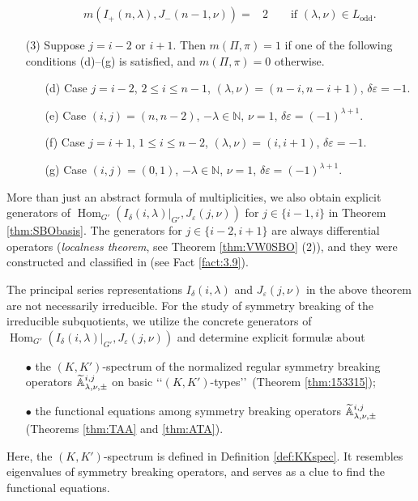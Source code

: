 \begin{theorem}
\begin{enumerate}
\begin{enumerate}
\begin{align*}
\\
m(I_+(n,\lambda), J_-(n-1,\nu))
=&
2
\qquad
\text{if }
(\lambda, \nu) \in L_{\operatorname{odd}}.   
\end{align*}
\end{enumerate}
\item[{\rm{(3)}}]
Suppose $j=i-2$ or $i+1$.  
Then $m(\Pi,\pi)=1$ 
 if one of the following conditions {\rm{(d)--(g)}}
 is satisfied, 
 and $m(\Pi,\pi)=0$ otherwise.  
\begin{enumerate}
\item[{\rm{(d)}}]
Case $j=i-2$, $2 \le i \le n-1$, $(\lambda, \nu)=(n-i,n-i+1)$, 
$\delta \varepsilon =-1$.  
\item[{\rm{(e)}}]
Case $(i,j)=(n,n-2)$, $-\lambda \in {\mathbb{N}}$, $\nu=1$, 
$\delta \varepsilon =(-1)^{\lambda+1}$.  
\item[{\rm{(f)}}]
Case $j=i+1$, $1 \le i \le n-2$, $(\lambda, \nu)=(i,i+1)$, 
$\delta \varepsilon =-1$.  
\item[{\rm{(g)}}]
Case $(i,j)=(0,1)$, $-\lambda \in {\mathbb{N}}$, $\nu=1$, 
$\delta \varepsilon =(-1)^{\lambda+1}$.  
\end{enumerate}
\end{enumerate}
\end{theorem}

\medskip
More than just an abstract formula of multiplicities, 
 we also obtain explicit generators
 of ${\operatorname{Hom}}_{G'}(I_{\delta}(i,\lambda)|_{G'}, J_{\varepsilon}(j,\nu))$
 for $j \in \{i-1,i\}$
 in Theorem \ref{thm:SBObasis}.  
The generators for $j \in \{i-2,i+1\}$ are always differential operators
 ({\it{localness theorem}}, 
 see Theorem \ref{thm:VW0SBO} (2)), 
 and they were constructed and classified in \cite{KKP}
 (see Fact \ref{fact:3.9}).  



The principal series representations
 $I_{\delta}(i,\lambda)$ and $J_{\varepsilon}(j,\nu)$
 in the above theorem
 are not necessarily irreducible.  
For the study of symmetry breaking of the irreducible subquotients,
 we utilize the concrete generators of 
${\operatorname{Hom}}_{G'}(I_{\delta}(i,\lambda)|_{G'}, J_{\varepsilon}(j,\nu))$ and determine explicit formul{\ae}
 about 
\begin{enumerate}
\item[$\bullet$]
the $(K,K')$-spectrum
 of the normalized regular symmetry breaking operators
 ${\widetilde{\mathbb{A}}}_{{\lambda},{\nu},{\pm}}^{{i,j}}$
 on basic \lq\lq{$(K,K')$-types}\rq\rq\
 (Theorem \ref{thm:153315});
\item[$\bullet$]
the functional equations among symmetry breaking operators
 ${\widetilde{\mathbb{A}}}_{{\lambda},{\nu},{\pm}}^{{i,j}}$
(Theorems \ref{thm:TAA} and \ref{thm:ATA}).  
\end{enumerate}
Here, 
  the 
$(K,K')$-spectrum is defined in Definition \ref{def:KKspec}.  
It resembles eigenvalues of symmetry breaking
 operators, 
 and serves as a clue to find the functional equations.  



